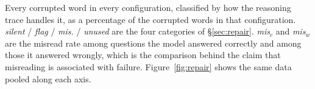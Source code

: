 \documentclass[11pt]{article}
\begin{document}
\begin{table}[H]
\centering
\scriptsize

\caption{Every corrupted word in every configuration, classified by how the
reasoning trace handles it, as a percentage of the corrupted words in that
configuration. \emph{silent} / \emph{flag} / \emph{mis.} / \emph{unused} are the
four categories of \S\ref{sec:repair}. \emph{mis}$_{c}$ and \emph{mis}$_{w}$ are
the misread rate among questions the model answered correctly and among those it
answered wrongly, which is the comparison behind the claim that misreading is
associated with failure. Figure~\ref{fig:repair} shows the same data pooled
along each axis.}
\label{tab:repair}
\end{table}
\end{document}
